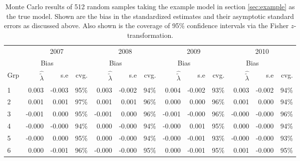 \documentclass[a4paper,11pt]{article}
\renewcommand{\l}{\lambda}
\newcommand{\0}{\boldsymbol{0}}
\begin{document}
\begin{table}[htb]\begin{small}
\begin{tabular}{lrrrrrrrrrrrr}
 \hline  \hline
& \multicolumn{3}{c}{2007} & \multicolumn{3}{c}{2008} & \multicolumn{3}{c}{2009} & \multicolumn{3}{c}{2010}\\
 \cline{2-13}
&	     \multicolumn{2}{c}{Bias} &  & \multicolumn{2}{c}{Bias} &  &\multicolumn{2}{c}{Bias} &  &\multicolumn{2}{c}{Bias} &  \\
\cline{2-3} \cline{5-6} \cline{8-9} \cline{11-12}
Grp&   $\hat{\tilde\l}$ & s.e & cvg. &$\hat{\tilde\l}$ & s.e & cvg. &$\hat{\tilde\l}$ & s.e & cvg. &$\hat{\tilde\l}$ & s.e & cvg. \\
  \hline
  1   &0.003 & -0.003& 95\%&0.003 & -0.002& 94\%&0.004 & -0.002& 93\%&0.003 & -0.002& 94\%\\
  2    &0.001 & 0.001& 97\%&0.001 & 0.001& 96\%&0.000 & 0.000& 96\%&0.001 & 0.000& 94\%\\
  3   &-0.001 & 0.000& 95\%&-0.001 & 0.000& 96\%&-0.001 & -0.000& 96\%&-0.000 & -0.000& 96\%\\
  4   &-0.000 & -0.000& 94\%&0.000 & -0.000& 94\%&-0.000 & 0.001& 95\%&0.000 & -0.000& 94\%\\
  5   &-0.000 & 0.000& 95\%&0.000 & -0.000& 94\%&-0.000 & -0.001& 93\%&-0.000 & -0.000& 93\%\\
  6   &0.000 & -0.001& 96\%&-0.000 & -0.000& 95\%&0.000 & -0.001& 95\%&0.001 & -0.000& 95\%\\
  \hline     \hline
\end{tabular}\end{small}
\caption{Monte Carlo results of 512 random samples taking the example model in section \ref{sec:example}  as the true model.
Shown are the bias in the standardized estimates and their asymptotic standard errors as discussed above. 
Also shown is the coverage of 95\% confidence intervals via the Fisher $z$-transformation.}\label{tab:montecarlo}
\end{table}
\end{document}
